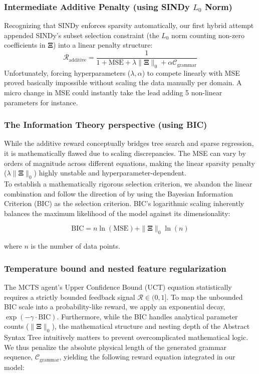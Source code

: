 \documentclass[11pt, a4paper]{article}
\begin{document}
\subsubsection{Intermediate Additive Penalty (using SINDy $L_0$ Norm)}
Recognizing that SINDy enforces sparsity automatically, our first hybrid attempt appended SINDy's subset selection constraint (the $L_0$ norm counting non-zero coefficients in $\mathbf{\Xi}$) into a linear penalty structure:
\begin{equation}
    \mathcal{R}_{\text{additive}} = \frac{1}{1 + \text{MSE} + \lambda \|\mathbf{\Xi}\|_0 + \alpha \mathcal{C}_{\text{grammar}}}
\end{equation}
Unfortunately, forcing hyperparameters ($\lambda, \alpha$) to compete linearly with MSE proved basically impossible without scaling the data manually per domain. A micro change in MSE could instantly take the lead adding 5 non-linear parameters for instance.

\vspace{0.3cm}
\subsubsection{The Information Theory perspective (using BIC)}
While the additive reward conceptually bridges tree search and sparse regression, it is mathematically flawed due to scaling discrepancies. The MSE can vary by orders of magnitude across different equations, making the linear sparsity penalty ($\lambda \|\mathbf{\Xi}\|_0$) highly unstable and hyperparameter-dependent.\\

To establish a mathematically rigorous selection criterion, we abandon the linear combination and follow the direction of \cite{brunton2017BIC} by using the Bayesian Information Criterion (BIC) as the selection criterion. BIC's logarithmic scaling inherently balances the maximum likelihood of the model against its dimensionality:

\begin{equation}
    \text{BIC} = n \ln(\text{MSE}) + \|\mathbf{\Xi}\|_0 \ln(n)
\end{equation}

where $n$ is the number of data points.

\vspace{0.3cm}
\subsubsection{Temperature bound and nested feature regularization}
The MCTS agent's Upper Confidence Bound (UCT) equation statistically requires a strictly bounded feedback signal $\mathcal{R} \in (0, 1]$. To map the unbounded BIC scale into a probability-like reward, we apply an exponential decay, $\exp(-\gamma \cdot \text{BIC})$. Furthermore, while the BIC handles analytical parameter counts ($\|\mathbf{\Xi}\|_0$), the mathematical structure and  nesting depth of the Abstract Syntax Tree intuitively matters to prevent overcomplicated mathematical logic.  We thus penalize the absolute physical length of the generated grammar sequence, $\mathcal{C}_{\text{grammar}}$, yielding the following reward equation integrated in our model:
\end{document}
